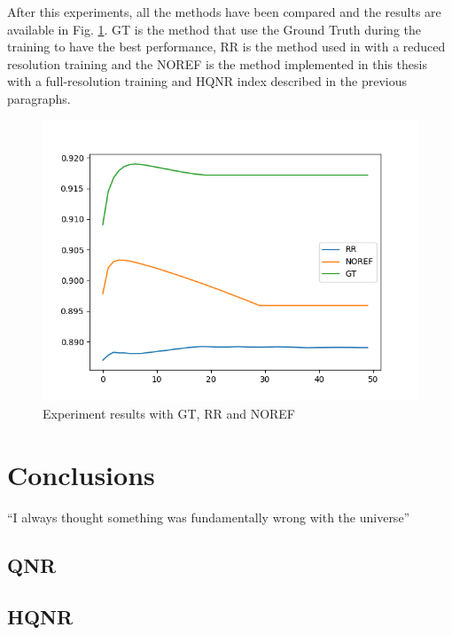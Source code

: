 \documentclass[12pt]{report}
\begin{document}
After this experiments, all the methods have been compared and the results are available in Fig. \ref{fig:gt_rr_noref}.
GT is the method that use the Ground Truth during the training to have the best performance,
RR is the method used in \cite{pnn} with a reduced resolution training and the NOREF is the method
implemented in this thesis with a full-resolution training and HQNR index described in the previous paragraphs. 

\begin{figure}[t]
    \centering
    \includegraphics[scale=.6]{toulouse_gt_rr_noref.png}
    \caption{Experiment results with GT, RR and NOREF}
    \label{fig:gt_rr_noref}
\end{figure}


\chapter*{Conclusions}
``I always thought something was fundamentally wrong with the universe'' \cite{criticalComparison}
\newpage




\newpage

\appendix

\begin{spacing}{1}
\section{QNR}
\label{qnr_functions}


\section{HQNR}
\label{hqnr_functions}

\end{spacing}
\end{document}
